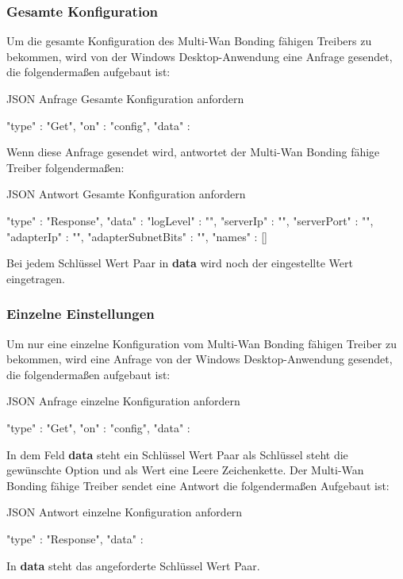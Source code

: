 \subsubsection{Gesamte Konfiguration}
Um die gesamte Konfiguration des Multi-Wan Bonding fähigen Treibers zu bekommen, wird von der Windows Desktop-Anwendung eine Anfrage gesendet, die folgendermaßen aufgebaut ist:
\begin{program}[H]
\caption{JSON Anfrage Gesamte Konfiguration anfordern}
\begin{GenericCode}
    {
        "type" :  "Get",
        "on" :  "config",
        "data" : {} 
    }     
\end{GenericCode}
\end{program}
\noindent
Wenn diese Anfrage gesendet wird, antwortet der Multi-Wan Bonding fähige Treiber folgendermaßen:
\begin{program}[H]
\caption{JSON Antwort Gesamte Konfiguration anfordern}
\begin{GenericCode}
    {
        "type" :  "Response",
        "data" : {
                    "logLevel" : "",
                    "serverIp" : "",
                    "serverPort" : "",
                    "adapterIp" : "",
                    "adapterSubnetBits" : "",
                    "names" : []
        } 
    }    
\end{GenericCode}
\end{program}
\noindent
Bei jedem Schlüssel Wert Paar in \textbf{data} wird noch der eingestellte Wert eingetragen.


\subsubsection{Einzelne Einstellungen}
Um nur eine einzelne Konfiguration vom Multi-Wan Bonding fähigen Treiber zu bekommen, wird eine Anfrage von der Windows Desktop-Anwendung gesendet, die folgendermaßen aufgebaut ist:
\begin{program}[H]
\caption{JSON Anfrage einzelne Konfiguration anfordern}
\begin{GenericCode}
    {
        "type" :  "Get",
        "on" :  "config",
        "data" : {} 
    }     
\end{GenericCode}
\end{program}
\noindent
In dem Feld \textbf{data} steht ein Schlüssel Wert Paar als Schlüssel steht die gewünschte Option und als Wert eine Leere Zeichenkette. Der Multi-Wan Bonding fähige Treiber sendet eine Antwort die folgendermaßen Aufgebaut ist: 
\begin{program}[H]
\caption{JSON Antwort einzelne Konfiguration anfordern}
\begin{GenericCode}
    {
        "type" :  "Response",
        "data" : {} 
    }    
\end{GenericCode}
\end{program}
\noindent
In \textbf{data} steht das angeforderte Schlüssel Wert Paar.

